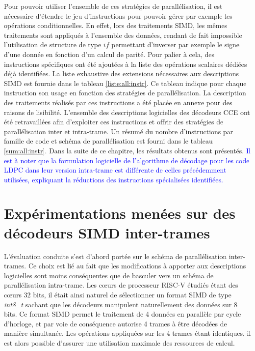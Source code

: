 \documentclass[../main.tex]{subfiles}
\begin{document}
Pour pouvoir utiliser l'ensemble de ces stratégies de parallélisation, il est nécessaire d'étendre le jeu d'instructions pour pouvoir gérer par exemple les opérations conditionnelles. 
En effet, lors des traitements SIMD, les mêmes traitements sont appliqués à l'ensemble des données, rendant de fait impossible l'utilisation de structure de type $if$ permettant d'inverser par exemple le signe d'une donnée en fonction d'un calcul de parité. 
Pour palier à cela, des instructions spécifiques ont été ajoutées à la liste des opérations scalaires dédiées déjà identifiées. 
La liste exhaustive des extensions nécessaires aux descriptions SIMD est fournie dans le tableau \ref{liste:all:instr}.
Ce tableau indique pour chaque instruction son usage en fonction des stratégies de parallélisation. 
La description des traitements réalisés par ces instructions a été placée en annexe pour des raisons de lisibilité. 
L'ensemble des descriptions logicielles des décodeurs CCE ont été retravaillées afin d'exploiter ces instructions et offrir des stratégies de parallélisation inter et intra-trame. 
Un résumé du nombre d'instructions par famille de code et schéma de parallélisation est fourni dans le tableau \ref{sum:all:instr}. 
Dans la suite de ce chapitre, les résultats obtenus sont présentés. \textcolor{blue}{Il est à noter que la formulation logicielle de l'algorithme de décodage pour les code LDPC dans leur version intra-trame est différente de celles précédemment utilisées, expliquant la réductions des instructions spécialisées identifiées.}

% 
% 
% 
% 
% 
\section{Expérimentations menées sur des décodeurs SIMD inter-trames}
% 
%  
% 
% 
% 

L'évaluation conduite s'est d'abord portée sur le schéma de parallélisation inter-trames. 
Ce choix est lié au fait que les modifications à apporter aux descriptions logicielles sont moins conséquentes que de basculer vers un schéma de parallélisation intra-trame.
Les cœurs de processeur RISC-V étudiés étant des cœurs 32 bits, il était ainsi naturel de sélectionner un format SIMD de type \textit{int8\_t } sachant que les décodeurs manipulent naturellement des données sur 8 bits. 
Ce format SIMD permet le traitement de 4 données en parallèle par cycle d'horloge, et par voie de conséquence autorise 4 trames à être décodées de manière simultanée. 
Les opérations appliquées sur les 4 trames étant identiques, il est alors possible d'assurer une utilisation maximale des ressources de calcul.
\end{document}
